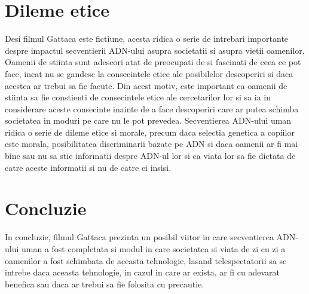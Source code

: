 \documentclass{article}
\begin{document}
\section{Dileme etice}
Desi filmul Gattaca este fictiune, acesta ridica o serie de intrebari importante despre impactul secventierii ADN-ului asupra societatii si asupra vietii oamenilor. Oamenii de stiinta sunt adeseori atat de preocupati de si fascinati de ceea ce pot face, incat nu se gandesc la consecintele etice ale posibilelor descoperiri si daca acestea ar trebui sa fie facute. Din acest motiv, este important ca oamenii de stiinta sa fie constienti de consecintele etice ale cercetarilor lor si sa ia in considerare aceste consecinte inainte de a face descoperiri care ar putea schimba societatea in moduri pe care nu le pot prevedea. Secventierea ADN-ului uman ridica o serie de dileme etice si morale, precum daca selectia genetica a copiilor este morala, posibilitatea discriminarii bazate pe ADN si daca oamenii ar fi mai bine sau nu sa stie informatii despre ADN-ul lor si ca viata lor sa fie dictata de catre aceste informatii si nu de catre ei insisi.

\section{Concluzie}
In concluzie, filmul Gattaca prezinta un posibil viitor in care secventierea ADN-ului uman a fost completata si modul in care societatea si viata de zi cu zi a oamenilor a fost schimbata de aceasta tehnologie, lasand telespectatorii sa se intrebe daca aceasta tehnologie, in cazul in care ar exista, ar fi cu adevarat benefica sau daca ar trebui sa fie folosita cu precautie. 
\end{document}

